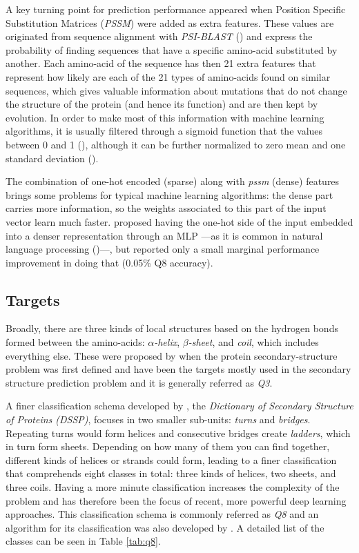 	A key turning point for prediction performance appeared when Position Specific Substitution Matrices (\textit{PSSM}) were added as extra features. These values are originated from sequence alignment with \textit{PSI-BLAST} (\cite{Altschul1997}) and express the probability of finding sequences that have a specific amino-acid substituted by another. Each amino-acid of the sequence has then 21 extra features that represent how likely are each of the 21 types of amino-acids found on similar sequences, which gives valuable information about mutations that do not change the structure of the protein (and hence its function) and are then kept by evolution. In order to make most of this information with machine learning algorithms, it is usually filtered through a sigmoid function that the values between 0 and 1 (\cite{Jones1999}), although it can be further normalized to zero mean and one standard deviation (\cite{Busia2017}).
	 
	The combination of one-hot encoded (sparse) along with \textit{pssm} (dense) features brings some problems for typical machine learning algorithms: the dense part carries more information, so the weights associated to this part of the input vector learn much faster. \cite{Li2016} proposed having the one-hot side of the input embedded into a denser representation through an MLP ---as it is common in natural language processing (\cite{Mesnil2015})---, but reported only a small marginal performance improvement in doing that (0.05\% Q8 accuracy).
	
	\subsection{Targets}
	Broadly, there are three kinds of local structures based on the hydrogen bonds formed between the amino-acids: $\alpha$\textit{-helix}, $\beta$\textit{-sheet}, and \textit{coil}, which includes everything else. These were proposed by \cite{Pauling1951} when the protein secondary-structure problem was first defined and have been the targets mostly used in the secondary structure prediction problem and it is generally referred as \textit{Q3}.
	
	A finer classification schema developed by \cite{Kabsch1983}, the \textit{Dictionary of Secondary Structure of Proteins (DSSP)}, focuses in two smaller sub-units: \textit{turns} and \textit{bridges}. Repeating turns would form helices and consecutive bridges create \textit{ladders}, which in turn form sheets. Depending on how many of them you can find together, different kinds of helices or strands could form, leading to a finer classification that comprehends eight classes in total: three kinds of helices, two sheets, and three coils. Having a more minute classification increases the complexity of the problem and has therefore been the focus of recent, more powerful deep learning approaches. This classification schema is commonly referred as \textit{Q8} and an algorithm for its classification was also developed by \cite{Kabsch1983}. A detailed list of the classes can be seen in Table \ref{tab:q8}.
	
